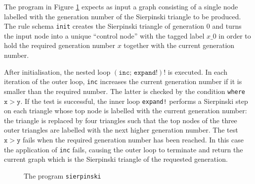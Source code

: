 \begin{example}
The program in Figure \ref{fig:sierpinski-prog} expects as input a graph consisting of a single node labelled with the generation number of the Sierpinski triangle to be produced. The rule schema \texttt{init} creates the Sierpinski triangle of generation 0 and turns the input node into a unique ``control node'' with the tagged label $x\_0$ in order to hold the required generation number $x$ together with the current generation number.

After initialisation, the nested loop $\mathtt{(inc;\, expand!)!}$ is executed. In each iteration of the outer loop, \texttt{inc} increases the current generation number if it is smaller than the required number. The latter is checked by the condition \texttt{where} $\mathtt{x > y}$. If the test is successful, the inner loop \texttt{expand!} performs a Sierpinski step on each triangle whose top node is labelled with the current generation number: the triangle is replaced by four triangles such that the top nodes of the three outer triangles are labelled with the next higher generation number. The test $\mathtt{x > y}$ fails when the required generation number has been reached. In this case the application of \texttt{inc} fails, causing the outer loop to terminate and return the current graph which is the Sierpinski triangle of the requested generation.

\begin{figure}[htb]
\label{fig:sierpinski-prog}
 \begin{center}
  
 \end{center}
\caption{The program \texttt{sierpinski}}
\end{figure}

\end{example}


